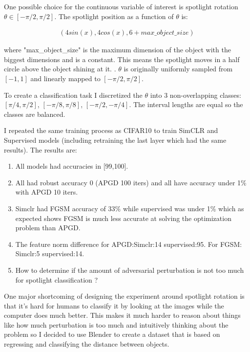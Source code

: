 \documentclass[../thesis.tex]{subfiles}
\begin{document}
One possible choice for the continuous variable of interest is spotlight rotation $\theta \in [-\pi/2, \pi/2]$. The spotlight position as a function of $\theta$ is: 

\begin{align}
(4 sin(x), 4 cos(x), 6+max\_object\_size)
\end{align}
 
where "max\_object\_size" is the maximum dimension of the object with the biggest dimensions and is a constant. This means the spotlight moves in a half circle above the object shining at it. . $\theta$ is originally uniformly sampled from $[-1,1]$ and linearly mapped to $[-\pi/2, \pi/2]$.


To create a classification task I discretized the $\theta$ into 3 non-overlapping classes: $[\pi/4, \pi/2]$, $[-\pi/8, \pi/8]$, $[-\pi/2, -\pi/4]$. The interval lengths are equal so the classes are balanced.       

I repeated the same training process as CIFAR10 to train SimCLR and Supervised models (including retraining the last layer which had the same results). The results are:


 \begin{enumerate}
 	\item All models had accuracies in [99,100].
 	
 	\item All had robust accuracy 0 (APGD 100 iters) and all have accuracy under 1\% with APGD 10 iters.
 	
 	\item Simclr had FGSM accuracy of 33\% while supervised was under 1\% which as expected shows FGSM is much less accurate at solving the optimization problem than APGD.
 	
 	\item The feature norm difference for APGD:\quad Simclr:14 \quad supervised:95.
 		 For FGSM: \quad Simclr:5 \quad supervised:14. 
 		 
 	\item How to determine if the amount of adversarial perturbation is not too much for spotlight classification ? 
 \end{enumerate}

One major shortcoming of designing the experiment around spotlight rotation is that it's hard for humans to classify it by looking at the images while the computer does much better. This makes it much harder to reason about things like how much perturbation is too much and intuitively thinking about the problem so I decided to use Blender to create a dataset that is based on regressing and classifying the distance between objects. 







 

    
\end{document}
